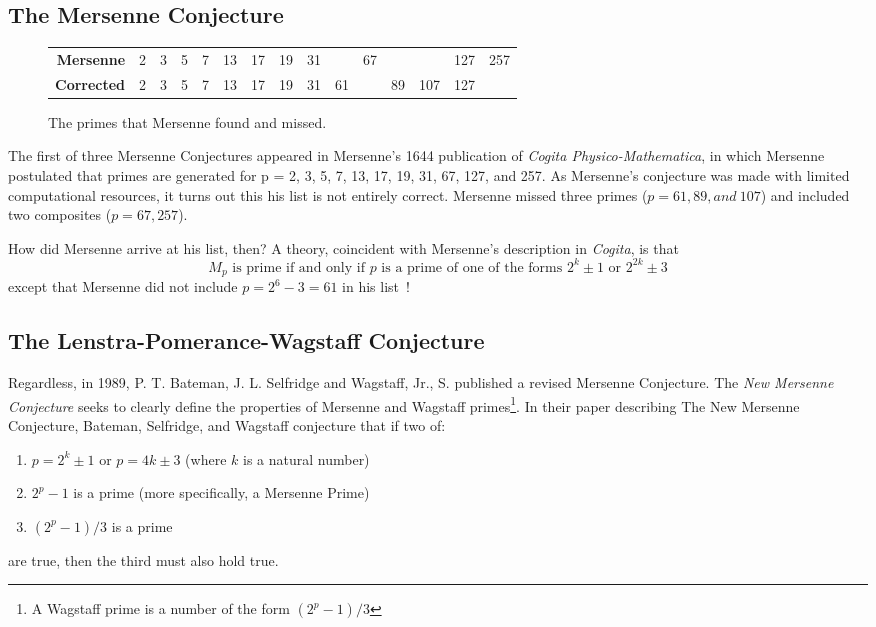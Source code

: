 \subsection{The Mersenne Conjecture}
\begin{figure}
\begin{tabular}{rcccccccccccccc}
\textbf{Mersenne}&2&3&5&7&13&17&19&31&&67&&&127&257\\
\textbf{Corrected}&2&3&5&7&13&17&19&31&61&&89&107&127&
\end{tabular}
\caption{The primes that Mersenne found and missed.}
\label{fig:conj}
\end{figure}

The first of three Mersenne Conjectures appeared in Mersenne’s 1644 publication of 
\textit{Cogita Physico-Mathematica}, in which Mersenne postulated that primes are generated for p = 2, 3, 5,
7, 13, 17, 19, 31, 67, 127, and 257. As Mersenne's conjecture was made with limited computational
resources, it turns out this his list is not entirely correct.
Mersenne missed three primes ($p = 61, 89, and~107$) and included two composites ($p = 67, 257$).

How did Mersenne arrive at his list, then? A theory, coincident with Mersenne's description in
\textit{Cogita}, is that
\begin{equation}
    M_p \text{ is prime if and only if $p$ is a prime of one of the forms } 2^k\pm1 \text{ or } 2^{2k}\pm3
\end{equation}
except that Mersenne did not include $p = 2^{6}-3 = 61$ in his list~\cite{newconjecture}!


\subsection{The Lenstra-Pomerance-Wagstaff Conjecture}

Regardless, in 1989, P. T. Bateman, J. L. Selfridge and Wagstaff, Jr., S. published a revised Mersenne Conjecture.
The \textit{New Mersenne Conjecture} seeks to clearly define the properties of Mersenne and Wagstaff primes\footnote{A Wagstaff prime is a number of the form $(2^p-1)/3$}.
In their paper describing The New Mersenne Conjecture, Bateman, Selfridge, and Wagstaff conjecture that if two of: 
\begin{enumerate}
\item $p = 2^k \pm 1$ or $p = 4k \pm 3$ (where $k$ is a natural number)
\item $2^p - 1$ is a prime (more specifically, a Mersenne Prime)
\item $(2^p - 1)/3$ is a prime
\end{enumerate}
are true, then the third must also hold true.

